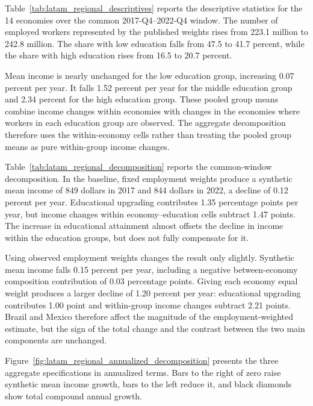 \documentclass[11pt]{article}
\begin{document}
Table~\ref{tab:latam_regional_descriptives} reports the descriptive statistics
for the 14 economies over the common 2017-Q4--2022-Q4 window. The number of
employed workers represented by the published weights rises from 223.1
million to 242.8 million. The share with low education falls from 47.5 to
41.7 percent, while the share with high education rises from 16.5 to 20.7
percent.



Mean income is nearly unchanged for the low education group, increasing 0.07
percent per year. It falls 1.52 percent per year for the middle education
group and 2.34 percent for the high education group. These pooled group means
combine income changes within economies with changes in the economies where
workers in each education group are observed. The aggregate decomposition
therefore uses the within-economy cells rather than treating the pooled group
means as pure within-group income changes.

Table~\ref{tab:latam_regional_decomposition} reports the common-window
decomposition. In the baseline, fixed employment weights produce a synthetic
mean income of 849 dollars in 2017 and 844 dollars in 2022, a decline of 0.12
percent per year. Educational upgrading contributes 1.35 percentage points
per year, but income changes within economy--education cells subtract 1.47
points. The increase in educational attainment almost offsets the decline in
income within the education groups, but does not fully compensate for it.



Using observed employment weights changes the result only slightly. Synthetic
mean income falls 0.15 percent per year, including a negative
between-economy composition contribution of 0.03 percentage points. Giving
each economy equal weight produces a larger decline of 1.20 percent per year:
educational upgrading contributes 1.00 point and within-group income changes
subtract 2.21 points. Brazil and Mexico therefore affect the magnitude of the
employment-weighted estimate, but the sign of the total change and the
contrast between the two main components are unchanged.

Figure~\ref{fig:latam_regional_annualized_decomposition} presents the three
aggregate specifications in annualized terms. Bars to the right of zero raise
synthetic mean income growth, bars to the left reduce it, and black diamonds
show total compound annual growth.
\end{document}
